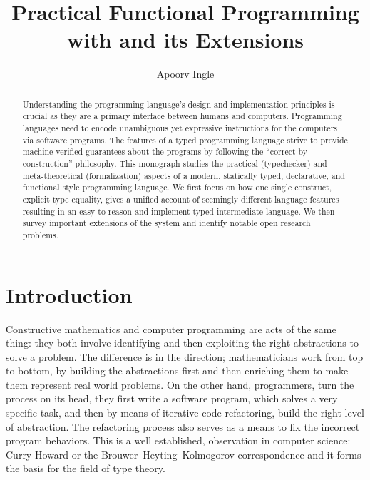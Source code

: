 \documentclass[screen,nonacm]{acmart}
\title{Practical Functional Programming with \SFC and its Extensions}
\author{Apoorv Ingle}
\affiliation{%
  \institution{University of Iowa} \department{Department of Computer Science} \streetaddress{McLean Hall} \city{Iowa City} \state{Iowa} \country{USA}}
\begin{document}
\begin{abstract}
  Understanding the programming language's design
  and implementation principles is crucial as
  they are a primary interface between humans
  and computers. Programming languages need to encode unambiguous yet
  expressive instructions for the computers via software programs. The
  features of a typed programming language strive to provide machine
  verified guarantees about the programs by following the  ``correct
  by construction'' philosophy. This monograph studies the practical
  (typechecker) and meta-theoretical (formalization) aspects of a
  modern, statically typed, declarative, and functional style
  programming language. We first focus on how one single construct,
  explicit type equality, gives a unified account of seemingly different
  language features resulting in an easy to reason
  and implement typed intermediate language. We then survey
  important extensions of the system and identify notable open
  research problems.
\end{abstract}

\maketitle
\section{Introduction}\label{sec:introduction}
Constructive mathematics and computer programming are acts of
the same thing: they both involve identifying and then exploiting the right
abstractions to solve a problem. The difference is in the direction;
mathematicians work from top to bottom, by building the abstractions
first and then enriching them to make them represent real world
problems. On the other hand, programmers, turn the process on its
head, they first write a software program, which solves a very specific
task, and then by means of iterative code refactoring, build the right
level of abstraction. The refactoring process also serves as a means
to fix the incorrect program behaviors. This is a well established,
observation in computer science: Curry-Howard or the
Brouwer–Heyting–Kolmogorov correspondence\cite{wadler_propositions_2015,han_deep_2023}
and it forms the basis for the field of type
theory\cite{barendregt_lambda_2013,hottbook_2013,nordstrom_programming_1990}.
\end{document}
